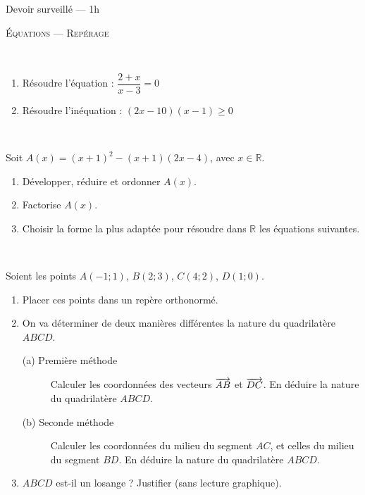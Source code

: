 \documentclass[11pt]{article}
\begin{document}
\begin{center}
  {\large
    Devoir surveillé --- 1h

    \textsc{Équations --- Repérage}
  }
\end{center}

\begin{exercice}~
  \begin{enumerate}
    \item Résoudre l'équation :
          $\dfrac{2+x}{x-3}=0$
    \item Résoudre l'inéquation :
      $(2x-10)(x-1)\geq0$
  \end{enumerate}
\end{exercice}

\begin{exercice}~

  Soit $A(x)=(x+1)^2-(x+1)(2x-4)$, avec $x\in{\mathbb R}$.
  \begin{enumerate}
    \item Développer, réduire et ordonner $A(x)$.
    \item Factorise $A(x)$.
    \item Choisir la forme la plus adaptée pour résoudre dans $\mathbb R$ les équations suivantes.

  \end{enumerate}
\end{exercice}

\begin{exercice}~

  Soient les points $A(-1;1)$, $B(2;3)$, $C(4;2)$, $D(1;0)$.
  \begin{enumerate}
    \item Placer ces points dans un repère orthonormé.
    \item On va déterminer de deux manières différentes la nature du quadrilatère $ABCD$.
      \begin{description}
        \item[(a) Première méthode] Calculer les coordonnées des vecteurs $\overrightarrow{AB}$ et $\overrightarrow{DC}$. En déduire la nature du quadrilatère $ABCD$.
        \item[(b) Seconde méthode] Calculer les coordonnées du milieu du segment $AC$, et celles du milieu du segment $BD$. En déduire la nature du quadrilatère $ABCD$.
      \end{description}
    \item $ABCD$ est-il un losange ? Justifier (sans lecture graphique).
  \end{enumerate}
\end{exercice}
\end{document}
